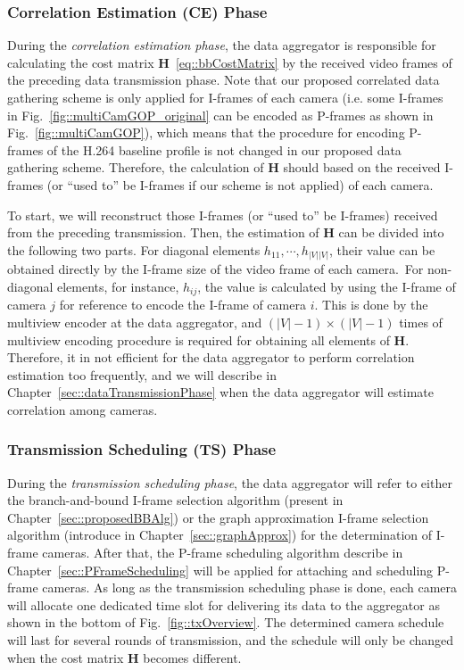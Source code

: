 {\subsubsection{Correlation Estimation (CE) Phase}
During the \emph{correlation estimation phase}, the data aggregator is responsible for calculating the cost matrix $\mathbf{H}$~\eqref{eq::bbCostMatrix} by the received video frames of the preceding data transmission phase.
Note that our proposed correlated data gathering scheme is only applied for I-frames of each camera (i.e. some I-frames in Fig.~\ref{fig::multiCamGOP_original} can be encoded as P-frames as shown in Fig.~\ref{fig::multiCamGOP}), which means that the procedure for encoding P-frames of the H.264 baseline profile is not changed in our proposed data gathering scheme.
Therefore, the calculation of $\mathbf{H}$ should based on the received I-frames (or ``used to'' be I-frames if our scheme is not applied) of each camera.

To start, we will reconstruct those I-frames (or ``used to'' be I-frames) received from the preceding transmission.
Then, the estimation of $\mathbf{H}$ can be divided into the following two parts.
For diagonal elements $h_{11},\cdots,h_{|V||V|}$, their value can be obtained directly by the I-frame size of the video frame of each camera.\
For non-diagonal elements, for instance, $h_{ij}$, the value is calculated by using the I-frame of camera $j$ for reference to encode the I-frame of camera $i$.
This is done by the multiview encoder at the data aggregator, and ${(|V|-1) \times (|V|-1)}$ times of multiview encoding procedure is required for obtaining all elements of $\mathbf{H}$.
Therefore, it in not efficient for the data aggregator to perform correlation estimation too frequently, and we will describe in Chapter~\ref{sec::dataTransmissionPhase} when the data aggregator will estimate correlation among cameras.
%
\subsubsection{Transmission Scheduling (TS) Phase}
During the \emph{transmission scheduling phase}, the data aggregator will refer to either the branch-and-bound I-frame selection algorithm (present in Chapter~\ref{sec::proposedBBAlg}) or the graph approximation I-frame selection algorithm (introduce in Chapter~\ref{sec::graphApprox}) for the determination of I-frame cameras.
After that, the P-frame scheduling algorithm describe in Chapter~\ref{sec::PFrameScheduling} will be applied for attaching and scheduling P-frame cameras.
As long as the transmission scheduling phase is done, each camera will allocate one dedicated time slot for delivering its data to the aggregator as shown in the bottom of Fig.~\ref{fig::txOverview}.
The determined camera schedule will last for several rounds of transmission, and the schedule will only be changed when the cost matrix $\mathbf{H}$ becomes different.
%
}
